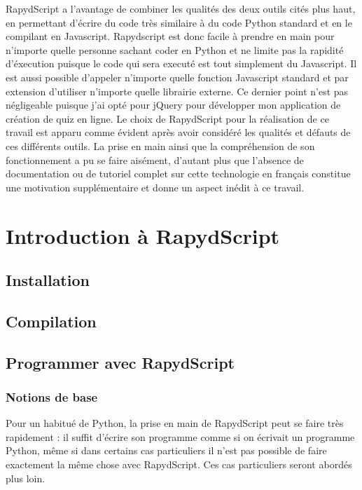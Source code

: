 \documentclass[a4,10pt,french]{sphinxmanual}
\begin{document}
RapydScript a l'avantage de combiner les qualités des deux outils cités plus haut, en permettant d'écrire du code très similaire à du code Python standard et en le compilant en Javascript. Rapydscript est donc facile à prendre en main pour n'importe quelle personne sachant coder en Python et ne limite pas la rapidité d'éxecution puisque le code qui sera executé est tout simplement du Javascript. Il est aussi possible d'appeler n'importe quelle fonction Javascript standard et par extension d'utiliser n'importe quelle librairie externe. Ce dernier point n'est pas négligeable puisque j'ai opté pour jQuery pour développer mon application de création de quiz en ligne. Le choix de RapydScript pour la réalisation de ce travail est apparu comme évident après avoir considéré les qualités et défauts de ces différents outils. La prise en main ainsi que la compréhension de son fonctionnement a pu se faire aisément, d'autant plus que l'absence de documentation ou de tutoriel complet sur cette technologie en français constitue une motivation supplémentaire et donne un aspect inédit à ce travail.


\section{Introduction à RapydScript}
\label{rapydscript:introduction-a-rapydscript}

\subsection{Installation}
\label{rapydscript:installation}

\subsection{Compilation}
\label{rapydscript:compilation}

\subsection{Programmer avec RapydScript}
\label{rapydscript:programmer-avec-rapydscript}

\subsubsection{Notions de base}
\label{rapydscript:notions-de-base}
Pour un habitué de Python, la prise en main de RapydScript peut se faire très rapidement : il suffit d'écrire son programme comme si on écrivait un programme Python, même si dans certains cas particuliers il n'est pas possible de faire exactement la même chose avec RapydScript. Ces cas particuliers seront abordés plus loin.
\end{document}
